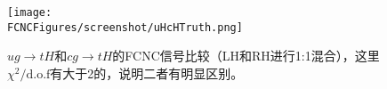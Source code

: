 \begin{figure}[H]
\centering
\texttt{[image: \\FCNCFigures/screenshot/uHcHTruth.png]}
\caption{$ug\to tH$和$cg\to tH$的FCNC信号比较（LH和RH进行1:1混合），这里$\chi^2/\mathrm{d.o.f}$有大于2的，说明二者有明显区别。}
\label{fig:uHcHTruth}
\end{figure}